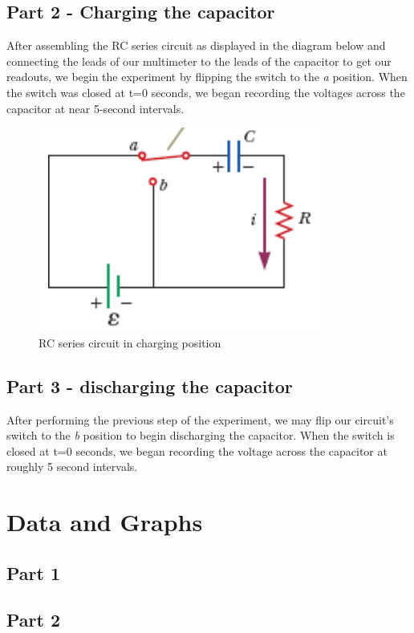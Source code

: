 \documentclass[titlepage]{article}
\begin{document}
    \subsection{Part 2 - Charging the capacitor} 
    After assembling the RC series circuit as displayed in the diagram below and connecting the leads of our multimeter to the leads of the capacitor to get our readouts, we begin the experiment by flipping the switch to the \emph{a} position. When the switch was closed at t=0 seconds, we began recording the voltages across the capacitor at near 5-second intervals. 

    \begin{figure}[hbt!]
        \centering
        \caption{RC series circuit in charging position}
        \includegraphics[scale=0.3]{images/procedure/charging.png}
    \end{figure}



    \subsection{Part 3 - discharging the capacitor}
    After performing the previous step of the experiment, we may flip our circuit's switch to the \emph{b} position to begin discharging the capacitor. When the switch is closed at t=0 seconds, we began recording the voltage across the capacitor at roughly 5 second intervals. 




	\section{Data and Graphs}
	\subsection{Part 1}
	\subsection{Part 2} 
\end{document}
